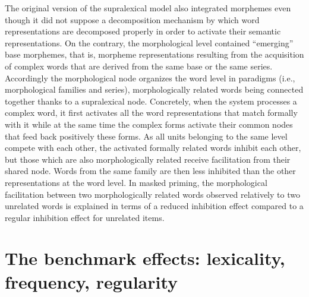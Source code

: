 \documentclass[output=paper]{langsci/langscibook}
\begin{document}
The original version of the supralexical model %
\citep{GiraudoGrainger2001} %
%
%
 also integrated morphemes even though it did not suppose a
decomposition mechanism by which word representations are decomposed
properly in order to activate their semantic representations. On the
contrary, the morphological level contained ``emerging'' base morphemes,
that is, morpheme representations resulting from the acquisition of
complex words that are derived from the same base or the same series.
Accordingly the morphological node organizes the word level in paradigms
(i.e., morphological families and series), morphologically related words
being connected together thanks to a supralexical node. Concretely, when
the system processes a complex word, it first activates all the word
representations that match formally with it while at the same time the
complex forms activate their common nodes that feed back positively
these forms. As all units belonging to the same level compete with each
other, the activated formally related words inhibit each other, but
those which are also morphologically related receive facilitation from
their shared node. Words from the same family are then less inhibited
than the other representations at the word level. In masked priming, the
morphological facilitation between two morphologically related words
observed relatively to two unrelated words is explained in terms of a
reduced inhibition effect compared to a regular inhibition effect for
unrelated items.

\section{The benchmark effects: lexicality, frequency,
regularity}\label{the-benchmark-effects-lexicality-frequency-regularity}
\end{document}
